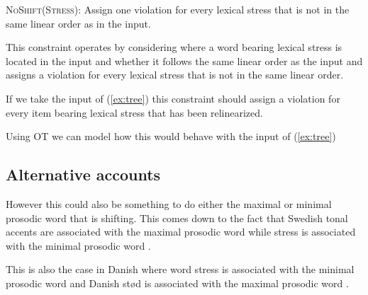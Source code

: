 \documentclass[12pt, letterpaper]{article}
\begin{document}
\ex \textsc{NoShift(Stress)}:
Assign one violation for every lexical stress that is not in the same linear order as in the input.

\ex This constraint operates by considering where a word bearing lexical stress is located in the input and whether it follows the same linear order as the input and assigns a violation for every lexical stress that is not in the same linear order.

\ex If we take the input of (\ref{ex:tree}) this constraint should assign a violation for every item bearing lexical stress that has been relinearized. 

\ex Using OT we can model how this would behave with the input of (\ref{ex:tree})
\z 
\subsection{Alternative accounts} \label{sec:MaximalW}

\ea However this could also be something to do either the maximal or minimal prosodic word that is shifting. This comes down to the fact that Swedish tonal accents are associated with the maximal prosodic word while stress is associated with the minimal prosodic word \citep{myrbergProsodicWordSwedish2013}. 

\ex This is also the case in Danish where word stress is associated with the minimal prosodic word and Danish stød is associated with the maximal prosodic word \citep[see discussion of stød placement in][]{kalivodaProsodicRecursionPseudocyclicity2018}.

\z 

\end{document}
